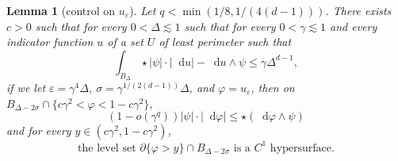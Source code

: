 \documentclass[reqno,10pt]{amsart}
\newcommand*\dif{\mathop{}\!\mathrm{d}}
\newtheorem{lemma}[theorem]{Lemma}
\theoremstyle{definition}
\numberwithin{equation}{section}
\begin{document}
\begin{lemma}[control on $u_\varepsilon$]\label{main mollifier lemma}
Let $q < \min(1/8, 1/(4(d - 1)))$. There exists $c > 0$ such that for every $0 < \Delta \lesssim 1$ such that for every $0 < \gamma \lesssim 1$ and every indicator function $u$ of a set $U$ of least perimeter such that
\begin{equation}\label{hypothesis on main mollifier lemma}
\int_{B_\Delta} \star |\psi| \cdot |\dif u| - \dif u \wedge \psi \leq \gamma \Delta^{d - 1},
\end{equation}
if we let $\varepsilon = \gamma^4\Delta$, $\sigma = \gamma^{1/(2(d - 1))}\Delta$, and $\varphi = u_\varepsilon$, then on $B_{\Delta - 2\sigma} \cap \{c\gamma^2 < \varphi < 1 - c\gamma^2\}$,
\begin{equation}\label{claim on main mollifier lemma}
(1 - o(\gamma^q)) |\psi| \cdot |\dif \varphi| \leq \star(\dif \varphi \wedge \psi)
\end{equation}
and for every $y \in (c\gamma^2, 1 - c\gamma^2)$,
\begin{equation}\label{claim 2 on main mollifier lemma}
\text{the level set } \partial \{\varphi > y\} \cap B_{\Delta - 2\sigma} \text{ is a }C^1\text{ hypersurface}.
\end{equation}
\end{lemma}
\end{document}
